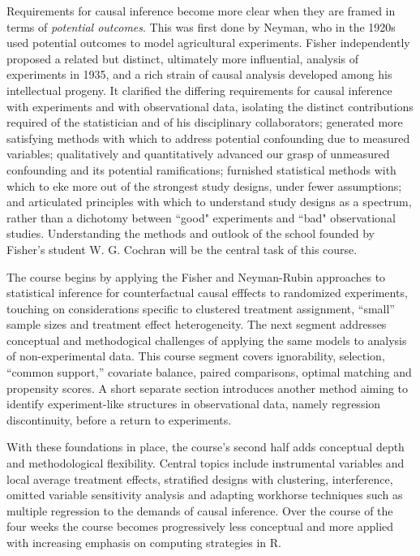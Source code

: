 \documentclass[12pt]{article}
\begin{document}
Requirements for causal inference become more clear when they are
framed in terms of \emph{potential outcomes}.  This was first done by
Neyman, who in the 1920s used potential outcomes to model agricultural
experiments.  Fisher independently proposed a related but distinct,
ultimately more influential, analysis of experiments in 1935, and a
rich strain of causal analysis developed among his intellectual
progeny.  It clarified the differing requirements for causal inference
with experiments and with observational data, isolating the distinct
contributions required of the statistician and of his disciplinary
collaborators; generated more satisfying methods with which to address
potential confounding due to measured variables; qualitatively and
quantitatively advanced our grasp of unmeasured confounding and its
potential ramifications; furnished statistical methods with which to
eke more out of the strongest study designs, under fewer assumptions;
and articulated principles with which to understand study designs as a
spectrum, rather than a dichotomy between ``good" experiments and
``bad" observational studies. Understanding the methods and outlook of
the school founded by Fisher's student W. G. Cochran will be the
central task of this course.

The course begins by applying the Fisher and Neyman-Rubin approaches to statistical inference for counterfactual causal efffects to randomized experiments, touching on considerations
specific to clustered treatment assignment, ``small'' sample sizes and
treatment effect heterogeneity. The next segment addresses conceptual
and methodogical challenges of applying the same models to analysis of
non-experimental data. This course segment covers ignorability,
selection, ``common support,'' covariate balance, paired comparisons,
optimal matching and propensity scores. A short separate section
introduces another method aiming to identify experiment-like
structures in observational data, namely regression discontinuity,
before a return to experiments.

With these foundations in place, the course's second half adds
conceptual depth and methodological flexibility.
Central topics include instrumental variables and local average
treatment effects, stratified designs with clustering, interference,
omitted variable sensitivity analysis and adapting workhorse
techniques such as multiple regression to the demands of causal
inference.  Over the course of the four weeks the course becomes
progressively less conceptual and more applied with increasing
emphasis on computing strategies in R.
\end{document}

